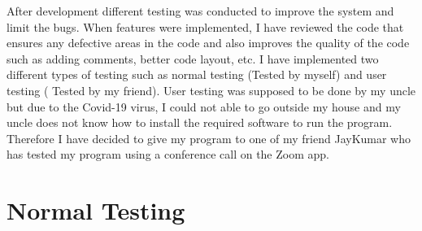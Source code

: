 After development different testing was conducted to improve the system and limit the bugs. When features were implemented, I have reviewed the code that ensures any defective areas in the code and also improves the quality of the code such as adding comments, better code layout, etc. I have implemented two different types of testing such as normal testing (Tested by myself) and user testing ( Tested by my friend). User testing was supposed to be done by my uncle but due to the Covid-19 virus, I could not able to go outside my house and my uncle does not know how to install the required software to run the program. Therefore I have decided to give my program to one of my friend JayKumar who has tested my program using a conference call on the Zoom app.

\section{Normal Testing}

